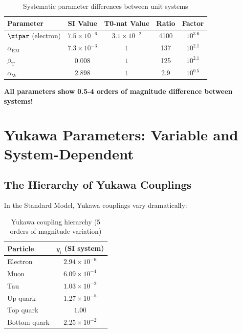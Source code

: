 	\begin{table}[htbp]
		\centering

\begin{tabular}{lcccc}
			\toprule
			\textbf{Parameter} & \textbf{SI Value} & \textbf{T0-nat Value} & \textbf{Ratio} & \textbf{Factor} \\
			\midrule
			$\xipar$ (electron) & $7.5 \times 10^{-6}$ & $3.1 \times 10^{-2}$ & 4100 & $10^{3.6}$ \\
			$\alpha_{\text{EM}}$ & $7.3 \times 10^{-3}$ & $1$ & 137 & $10^{2.1}$ \\
			$\beta_{\text{T}}$ & $0.008$ & $1$ & 125 & $10^{2.1}$ \\
			$\alpha_{\text{W}}$ & $2.898$ & $1$ & 2.9 & $10^{0.5}$ \\
			\bottomrule
		\end{tabular}
		\caption{Systematic parameter differences between unit systems}
		\label{tab:parameter_comparison}
	\end{table}
	
	\textbf{All parameters show 0.5-4 orders of magnitude difference between systems!}
	
	\section{Yukawa Parameters: Variable and System-Dependent}
	\label{sec:yukawa_parameters}
	
	\subsection{The Hierarchy of Yukawa Couplings}
	\label{subsec:yukawa_hierarchy}
	
	In the Standard Model, Yukawa couplings vary dramatically:
	
	\begin{table}[htbp]
		\centering
		\begin{tabular}{lc}
			\toprule
			\textbf{Particle} & \textbf{$y_i$ (SI system)} \\
			\midrule
			Electron & $2.94 \times 10^{-6}$ \\
			Muon & $6.09 \times 10^{-4}$ \\
			Tau & $1.03 \times 10^{-2}$ \\
			Up quark & $1.27 \times 10^{-5}$ \\
			Top quark & $1.00$ \\
			Bottom quark & $2.25 \times 10^{-2}$ \\
			\bottomrule
		\end{tabular}
		\caption{Yukawa coupling hierarchy (5 orders of magnitude variation)}
		\label{tab:yukawa_hierarchy}
	\end{table}
	
